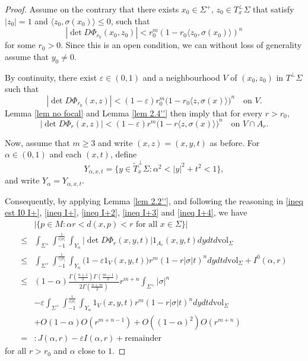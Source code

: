\documentclass[10pt,a4paper]{amsart}
\begin{document}
\begin{proof}

Assume on the contrary that there exists $x_{0}\in \Sigma^+$, $z_{0}\in {T}_{x}^{\perp}\Sigma$ that satisfy $|z_{0}|=1$ and $\langle z_0, \sigma(x_0)\rangle \le0$, such that
$$
\left|\det D \Phi_{r_{0}}(x_{0}, z_0)\right| < r_{0}^m\left(1-r_0\langle z_0, \sigma(x_0)\rangle \right)^n
$$
for some $r_{0}>0$. Since this is an open condition, we can without loss of generality assume that $y_0\ne0$.

By continuity, there exist $\varepsilon\in(0, 1)$ and a neighbourhood $V$ of $(x_{0}, z_0)$ in $T^{\perp}\Sigma$ such that
$$
\left|\det D\Phi_{r_{0}}(x, z)\right|
< (1-\varepsilon) r_{0}^{m} \bigl(1-r_{0}\langle z, \sigma(x)\rangle \bigr)^{n}
\quad\text{on } V.
$$
Lemma \ref{lem no focal} and Lemma \ref{lem 2.4''} then imply that for every $r>r_{0}$,
$$
\left|\det D\Phi_{r}(x, z)\right|
< (1-\varepsilon) r^{m} \bigl(1-r \langle z, \sigma(x)\rangle \bigr)^{n}
\quad\text{on } V\cap A_{r}.
$$

Now, assume that $m\ge 3$ and write $(x, z)=(x, y, t)$ as before.
For $\alpha\in(0, 1)$ and each $(x, t)$, define
$$
Y_{\alpha, x, t}
=\bigl\{ y\in\widetilde T_{x}^{\perp}\Sigma:
\alpha^{2}<|y|^{2}+t^{2}<1\bigr\},
$$
and write $Y_{\alpha}=Y_{\alpha, x, t}$.

Consequently, by applying Lemma \ref{lem 2.2''}, and following the reasoning in \eqref{ineq est I0 I+}, \eqref{ineq I+}, \eqref{ineq I+2}, \eqref{ineq I+3} and \eqref{ineq I+4}, we have
\begin{equation}\label{ineq est equality case}
\begin{aligned}
& |\{p \in M: \alpha r<d(x, p)<r \text { for all } x \in \Sigma\}| \\
\le& \int_{\Sigma^+} \int_{-1}^{\frac{1}{r|\sigma|}} \int_{Y_\alpha}
\left|\det D \Phi_r(x, y, t)\right| 1_{A_r}(x, y, t) d y d t d \mathrm{vol}_{\Sigma} \\
\le& \int_{\Sigma^+} \int_{-1}^{\frac{1}{r|\sigma|}} \int_{Y_\alpha}
\big(1-\varepsilon 1_{V}(x, y, t)\big) r^m\left(1-r|\sigma| t\right)^n d y d t d \mathrm{vol}_{\Sigma}+I^{0}(\alpha, r)\\
\le&
(1-\alpha)\frac{\Gamma\left(\frac{n+1}{2}\right) \Gamma\left(\frac{m-1}{2}\right)}{2 \Gamma\left(\frac{n+m}{2}\right)} r^{m+n}\int_{\Sigma^+}|\sigma|^n\\
& - \varepsilon \int_{\Sigma^+} \int_{-1}^{\frac{1}{r|\sigma|}} \int_{Y_\alpha}
1_{V}(x, y, t) r^m\left(1-r|\sigma| t\right)^n d y d t d \mathrm{vol}_{\Sigma}\\
& +O(1-\alpha)O\left(r^{m+n-1}\right) +O((1-\alpha)^2)O(r^{m+n})\\
=&:J(\alpha, r)-\varepsilon I(\alpha, r)+\mathrm{remainder}
\end{aligned}
\end{equation}
for all $r>r_{0}$ and $\alpha$ close to $1$.


\end{proof}
\end{document}
